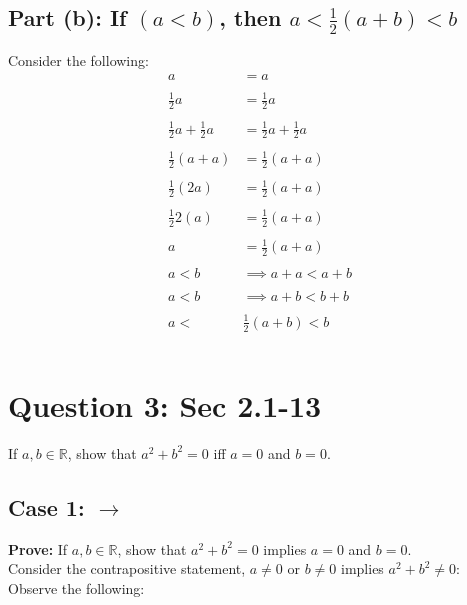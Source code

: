 \documentclass[11pt]{article}
\theoremstyle{plain}
\begin{document}
\subsection*{Part (b): If $(a<b)$, then $a<\frac{1}{2}(a+b)<b$}
Consider the following:
\[
	\begin{aligned}
		a                           & =  a                           \\ \\
		\frac{1}{2}a                & =  \frac{1}{2}a                \\ \\
		\frac{1}{2}a + \frac{1}{2}a & =  \frac{1}{2}a + \frac{1}{2}a \\ \\
		\frac{1}{2}(a + a)          & =  \frac{1}{2}(a + a)          \\ \\
		\frac{1}{2}(2a)             & =  \frac{1}{2}(a + a)          \\ \\
		\frac{1}{2}2(a)             & =  \frac{1}{2}(a + a)          \\ \\
		a                           & =  \frac{1}{2}(a + a)          \\ \\
		a < b                       & \implies a+a < a+b             \\ \\
		a < b                       & \implies a+b < b+b             \\ \\
		a <                         & \frac{1}{2}(a + b) < b         \\ \\
	\end{aligned}
\]
\section*{Question 3: Sec 2.1-13}
\begin{center} If $a,b \in \mathbb{R}$, show that $a^2+b^2=0$ iff $a=0$ and $b=0$.  \end{center}
\subsection*{Case 1: $\rightarrow$}
\begin{center}
	\textbf{Prove:} If $a,b \in \mathbb{R}$, show that $a^2+b^2=0$ implies $a=0$ and $b=0$.  \\
	Consider the contrapositive statement, $a \neq 0$ or $b \neq 0$ implies $a^2 + b^2 \neq 0$:\\
	Observe the following:
\end{center}
\end{document}
